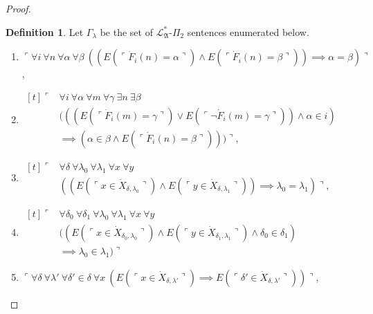 \documentclass[12pt, twoside]{memoir}
\numberwithin{equation}{section}
\theoremstyle{definition}
\newtheorem{defi}[thm]{Definition}
\theoremstyle{remark}
\theoremstyle{definition}
\theoremstyle{definition}
\theoremstyle{definition}
\theoremstyle{remark}
\begin{document}
\begin{proof}
\begin{defi}\label{defc}
Let $\Gamma_{\lambda}$ be the set of $\mathcal{L}^*_{\mathfrak{A}}$-$\Pi_2$ sentences enumerated below.  
\begin{enumerate}[label=(S\arabic*)$_{\lambda}$, leftmargin=40pt]
    \item\label{c1} $\ulcorner \forall i \ \forall n \ \forall \alpha \ \forall \beta \ ((E(\ulcorner \dot{F}_i (n) = \alpha \urcorner) \wedge E(\ulcorner \dot{F}_i (n) = \beta \urcorner)) \implies \alpha = \beta) \urcorner$,
    
    \item\label{c2}
    \!
    $\begin{aligned}[t]
        \ulcorner & \forall i \ \forall \alpha \ \forall m \ \forall \gamma \ \exists n \ \exists \beta \\
        & (((E(\ulcorner \dot{F}_i (m) = \gamma \urcorner) \vee E(\ulcorner \neg \dot{F}_i (m) = \gamma \urcorner)) \wedge \alpha \in i) \\
        & \implies (\alpha \in \beta \wedge E(\ulcorner \dot{F}_i (n) = \beta \urcorner))) \urcorner, 
    \end{aligned}$

    \item\label{c3} 
    \!
    $\begin{aligned}[t]
        \ulcorner & \forall \delta \ \forall \lambda_0 \ \forall \lambda_1 \ \forall x \ \forall y \\
        & ((E(\ulcorner x \in \dot{X}_{\delta, \lambda_0} \urcorner) \wedge E(\ulcorner y \in \dot{X}_{\delta, \lambda_1} \urcorner)) \implies \lambda_0 = \lambda_1) \urcorner,
    \end{aligned}$

    \item\label{c4}
    \!
    $\begin{aligned}[t]
        \ulcorner & \forall \delta_0 \ \forall \delta_1 \ \forall \lambda_0 \ \forall \lambda_1 \ \forall x \ \forall y \\
        & ((E(\ulcorner x \in \dot{X}_{\delta_0, \lambda_0} \urcorner) \wedge E(\ulcorner y \in \dot{X}_{\delta_1, \lambda_1} \urcorner) \wedge \delta_0 \in \delta_1) \\
        & \implies \lambda_0 \in \lambda_1) \urcorner
    \end{aligned}$

    \item\label{c5} $\ulcorner \forall \delta \ \forall \lambda' \ \forall \delta' \in \delta \ \forall x \ (E(\ulcorner x \in \dot{X}_{\delta, \lambda'} \urcorner) \implies E(\ulcorner \delta' \in \dot{X}_{\delta, \lambda'} \urcorner)) \urcorner$, 
    

\end{enumerate}
\end{defi}
\end{proof}
\end{document}
